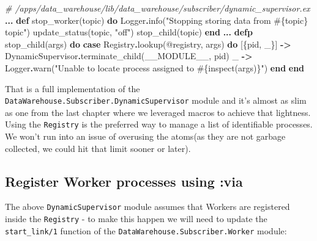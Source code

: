 \documentclass[
  oneside]{book}
\newenvironment{Shaded}{\begin{snugshade}}{\end{snugshade}}
\newcommand{\CommentTok}[1]{\textcolor[rgb]{0.56,0.35,0.01}{\textit{#1}}}
\newcommand{\ConstantTok}[1]{\textcolor[rgb]{0.00,0.00,0.00}{#1}}
\newcommand{\KeywordTok}[1]{\textcolor[rgb]{0.13,0.29,0.53}{\textbf{#1}}}
\newcommand{\NormalTok}[1]{#1}
\newcommand{\OperatorTok}[1]{\textcolor[rgb]{0.81,0.36,0.00}{\textbf{#1}}}
\newcommand{\OtherTok}[1]{\textcolor[rgb]{0.56,0.35,0.01}{#1}}
\newcommand{\StringTok}[1]{\textcolor[rgb]{0.31,0.60,0.02}{#1}}
\begin{document}
\begin{Shaded}
\begin{Highlighting}[]
  \CommentTok{\# /apps/data\_warehouse/lib/data\_warehouse/subscriber/dynamic\_supervisor.ex}
  \OperatorTok{...}
  \KeywordTok{def}\NormalTok{ stop\_worker(topic) }\KeywordTok{do}
    \ConstantTok{Logger}\OperatorTok{.}\NormalTok{info(}\StringTok{"Stopping storing data from }\OtherTok{\#\{}\NormalTok{topic}\OtherTok{\}}\StringTok{ topic"}\NormalTok{)}
\NormalTok{    update\_status(topic, }\StringTok{"off"}\NormalTok{)}
\NormalTok{    stop\_child(topic)}
  \KeywordTok{end}
  \OperatorTok{...}
  \KeywordTok{defp}\NormalTok{ stop\_child(args) }\KeywordTok{do}
    \KeywordTok{case} \ConstantTok{Registry}\OperatorTok{.}\NormalTok{lookup(}\OtherTok{@registry}\NormalTok{, args) }\KeywordTok{do}
\NormalTok{      [\{pid, \_\}] }\OperatorTok{{-}\textgreater{}} \ConstantTok{DynamicSupervisor}\OperatorTok{.}\NormalTok{terminate\_child(}\ConstantTok{\_\_MODULE\_\_}\NormalTok{, pid)}
\NormalTok{      \_ }\OperatorTok{{-}\textgreater{}} \ConstantTok{Logger}\OperatorTok{.}\NormalTok{warn(}\StringTok{"Unable to locate process assigned to }\OtherTok{\#\{}\NormalTok{inspect(args)}\OtherTok{\}}\StringTok{"}\NormalTok{)}
    \KeywordTok{end}
  \KeywordTok{end}
\end{Highlighting}
\end{Shaded}

That is a full implementation of the \texttt{DataWarehouse.Subscriber.DynamicSupervisor} module and it's almost as slim as one from the last chapter where we leveraged macros to achieve that lightness. Using the \texttt{Registry} is the preferred way to manage a list of identifiable processes. We won't run into an issue of overusing the atoms(as they are not garbage collected, we could hit that limit sooner or later).

\hypertarget{register-worker-processes-using-via}{%
\subsection{Register Worker processes using :via}\label{register-worker-processes-using-via}}

The above \texttt{DynamicSupervisor} module assumes that Workers are registered inside the \texttt{Registry} - to make this happen we will need to update the \texttt{start\_link/1} function of the \texttt{DataWarehouse.Subscriber.Worker} module:
\end{document}
